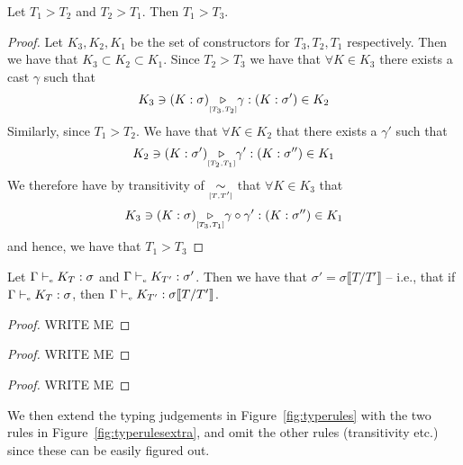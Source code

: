 \begin{thm}[Transitivity of $(>)$]
Let $T_1 > T_2$ and $T_2 > T_1$. Then $T_1 > T_3$.
\begin{proof}
Let $K_3, K_2, K_1$ be the set of constructors for $T_3, T_2, T_1$
respectively. Then we have that $K_3 \subset K_2 \subset K_1$. Since $T_2 >
T_3$ we have that $\forall K \in K_3$ there exists a cast $\gamma$ such that 
\begin{equation}
  K_3 \ni (K : \sigma) {\underset{{\scriptscriptstyle [T_3,T_2]}}{\triangleright}} \gamma :(K : \sigma') \in K_2
\end{equation}
Similarly, since $T_1 > T_2$. We have that $\forall K \in K_2$ that there
exists a $\gamma'$ such that
\begin{equation}
  K_2 \ni (K : \sigma') {\underset{{\scriptscriptstyle [T_2,T_1]}}{\triangleright}} \gamma' : (K : \sigma'') \in K_1
\end{equation}
We therefore have by transitivity of ${\underset{{\scriptscriptstyle [T,T']}}{\sim}}$ that $\forall
K \in K_3$ that
\begin{equation}
  K_3 \ni (K : \sigma) {\underset{{\scriptscriptstyle [T_3,T_1]}}{\triangleright}} \gamma \circ
  \gamma' : (K : \sigma'') \in K_1
\end{equation}
and hence, we have that $T_1 > T_3$
\qedhere
\end{proof}
\end{thm}

\begin{thm}
  Let $\Gamma \vdash_{\textrm{\tiny e}} K_T : \sigma$ and $\Gamma \vdash_{\textrm{\tiny e}} K_{T'}: \sigma'$. 
  Then we have that $\sigma' = \sigma \llbracket T/T' \rrbracket$ -- i.e., that
  if $\Gamma \vdash_{\textrm{\tiny e}} K_T : \sigma$, then $\Gamma \vdash_{\textrm{\tiny e}} K_{T'} : \sigma \llbracket T/T' \rrbracket$. 
\begin{proof}
WRITE ME \qedhere
\end{proof}
\end{thm}

\begin{thm}
\begin{proof}
WRITE ME \qedhere
\end{proof}
\end{thm}

\begin{thm}
\begin{proof}
WRITE ME \qedhere
\end{proof}
\end{thm}

We then extend the typing judgements in Figure~\ref{fig:typerules} with the
two rules in Figure~\ref{fig:typerulesextra}, and omit the other rules (transitivity etc.) since these can be
easily figured out.

